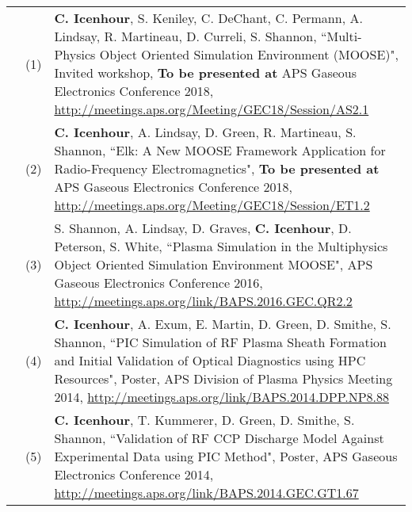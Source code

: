 \documentclass{article}
\begin{document}
	\begin{tabularx}{\textwidth}{l l X}
		\hspace{2em} & (1)  & \textbf{C. Icenhour}, S. Keniley, C. DeChant, C. Permann, A. Lindsay, R. Martineau, D. Curreli, S. Shannon, ``Multi-Physics Object Oriented Simulation Environment (MOOSE)", Invited workshop, \textbf{To be presented at} APS Gaseous Electronics Conference 2018, \url{http://meetings.aps.org/Meeting/GEC18/Session/AS2.1} \\
			& (2)  & \textbf{C. Icenhour}, A. Lindsay, D. Green, R. Martineau, S. Shannon, ``Elk: A New MOOSE Framework Application for Radio-Frequency Electromagnetics", \textbf{To be presented at} APS Gaseous Electronics Conference 2018, \url{http://meetings.aps.org/Meeting/GEC18/Session/ET1.2} \\
			& (3)  &  S. Shannon, A. Lindsay, D. Graves, \textbf{C. Icenhour}, D. Peterson, S. White, ``Plasma Simulation in the Multiphysics Object Oriented Simulation Environment MOOSE", APS Gaseous Electronics Conference 2016, \newline \url{http://meetings.aps.org/link/BAPS.2016.GEC.QR2.2} \\
			& (4)  & \textbf{C. Icenhour}, A. Exum, E. Martin, D. Green, D. Smithe, S. Shannon, ``PIC Simulation of RF Plasma Sheath Formation and Initial Validation of Optical Diagnostics using HPC Resources", Poster, APS Division of Plasma Physics Meeting 2014, \url{http://meetings.aps.org/link/BAPS.2014.DPP.NP8.88} \\
			& (5)  & \textbf{C. Icenhour}, T. Kummerer, D. Green, D. Smithe, S. Shannon, ``Validation of RF CCP Discharge Model Against Experimental Data using PIC Method", Poster, APS Gaseous Electronics Conference 2014, \newline \url{http://meetings.aps.org/link/BAPS.2014.GEC.GT1.67}
	\end{tabularx}
\end{document}

